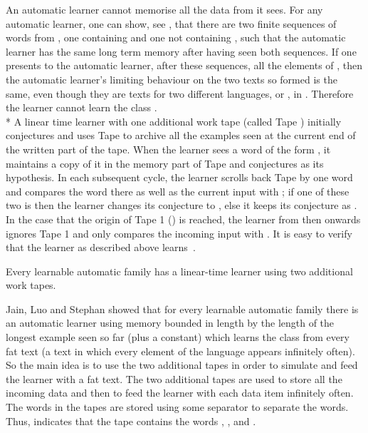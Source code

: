 \documentclass{LMCS}
\theoremstyle{plain}\newtheorem{athm}[thm]{Theorem}
\theoremstyle{plain}\newtheorem{aprop}[thm]{Proposition}
\theoremstyle{plain}\newtheorem{aprob}[thm]{Open Problem}
\theoremstyle{plain}\newtheorem{acor}[thm]{Corollary}
\theoremstyle{plain}\newtheorem{alem}[thm]{Lemma}
\theoremstyle{definition}\newtheorem{adefn}[thm]{Definition}
\theoremstyle{definition}\newtheorem{arem}[thm]{Remark}
\theoremstyle{plain}\newtheorem{aexmp}[thm]{Example}
\theoremstyle{plain}\newtheorem{aclm}[thm]{Claim}
\def\niceqed{~~}
\def\sp{\\*\indent}
\begin{document}
\proof
An automatic learner cannot memorise all the data from  it sees.
For any automatic learner, one can show, see \cite{JLS09}, that there
are two finite sequences
of words from , one containing  and one not
containing , such that the
automatic learner has the same long term memory after having seen both
sequences.
If one presents to the automatic learner, after these sequences, all
the elements
of , then the automatic learner's limiting behaviour on the
two texts so formed is the same, even though they are texts for two different
languages,  or , in .
Therefore the learner cannot learn the class .
\sp
A linear time learner with one additional work tape (called Tape )
initially conjectures  and uses Tape  to archive 
all the examples seen at the current end of the written part of the tape.
When the learner sees a word of the form , it maintains a copy of
it in the memory part of Tape  and conjectures  as its hypothesis. 
In each subsequent cycle, the
learner scrolls back Tape  by one word and compares the word there
as well as the current input with ; if one of these two is  then
the learner changes its conjecture to , else it keeps its
conjecture as .
In the case that the origin of Tape 1 () is reached, the learner from
then onwards ignores Tape 1 and only compares the incoming input
with .
It is easy to verify that the learner as described above learns~.\niceqed

\begin{thm} \label{th:twotapes}
Every learnable automatic family  has a linear-time learner using
two additional work tapes.
\end{thm}

\proof
Jain, Luo and Stephan \cite{JLS09} showed that for every learnable
automatic family  there is an automatic
learner  using memory bounded in length by the length 
of the longest example seen
so far (plus a constant) which learns the class from every fat text
(a text in which every element of the language appears infinitely often). 
So the main idea is to use the two additional tapes in order to 
simulate and feed the learner  with a fat text. 
The two additional tapes are used to store all the incoming data and
then to feed the learner  with each data item infinitely often.
The words in the tapes are stored using some separator  to separate
the words. Thus,  indicates that the tape
contains the words , ,  and .
\end{document}
